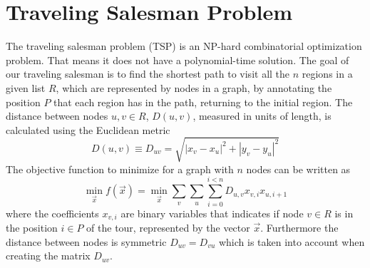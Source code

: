 \section{Traveling Salesman Problem}
The traveling salesman problem (TSP) is an NP-hard combinatorial optimization problem. That means it does not have a polynomial-time solution. The goal of our traveling salesman is to find the shortest path to visit all the $n$ regions in a given list $R$, which are represented by nodes in a graph, by annotating the position $P$ that each region has in the path, returning to the initial region. The distance between nodes $u,v \in R$, $D(u,v)$, measured in units of length, is calculated using the Euclidean metric
\begin{equation}
    D(u,v) \equiv D_{uv}= \sqrt{\left|x_{v} - x_{u}\right|^{2} + \left|y_{v} - y_{u} \right|^{2}} 
\end{equation}
The objective function to minimize for a graph with $n$ nodes can be written as
\begin{equation}
\label{eq:TSP_noconstraints}
    \min_{\vec{x}} f(\vec{x}) = \min_{\vec{x}} \sum_{v} \sum_{u} \sum_{i=0}^{i<n}D_{u,v}x_{v,i}x_{u, i+1}
\end{equation}
where the coefficients $x_{v,i}$ are binary variables that indicates if node $v \in R$ is in the position $i\in P$ of the tour, represented by the vector $\vec{x}$. Furthermore the distance between nodes is symmetric $D_{uv} = D_{vu}$ which is taken into account when creating the matrix $D_{uv}$.
